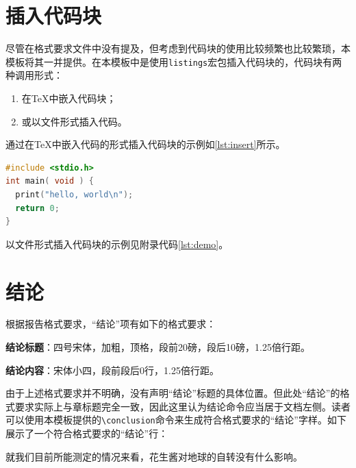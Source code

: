 \section{插入代码块}

尽管在格式要求文件中没有提及，但考虑到代码块的使用比较频繁也比较繁琐，本模板将其一并提供。在本模板中是使用\texttt{listings}宏包插入代码块的，代码块有两种调用形式：

\begin{enumerate}
  \item 在\TeX 中嵌入代码块；
  \item 或以文件形式插入代码。
\end{enumerate}

通过在\TeX 中嵌入代码的形式插入代码块的示例如\ref{lst:insert}所示。

\begin{lstlisting}[language=C, caption={在\TeX 中嵌入代码的形式插入代码块\label{lst:insert}}]
#include <stdio.h>
int main( void ) {
  print("hello, world\n");
  return 0;
}
\end{lstlisting}

以文件形式插入代码块的示例见附录代码\ref{lst:demo}。
    
\section{结论}

根据报告格式要求，“结论”项有如下的格式要求：

\textbf{结论标题}：四号宋体，加粗，顶格，段前20磅，段后10磅，1.25倍行距。

\textbf{结论内容}：宋体小四，段前段后0行，1.25倍行距。

由于上述格式要求并不明确，没有声明“结论”标题的具体位置。但此处“结论”的格式要求实际上与章标题完全一致，因此这里认为结论命令应当居于文档左侧。读者可以使用本模板提供的\texttt{\textbackslash conclusion}命令来生成符合格式要求的“结论”字样。如下展示了一个符合格式要求的“结论”行：

\conclusion

就我们目前所能测定的情况来看，花生酱对地球的自转没有什么影响\autocite{PeanutButter}。
